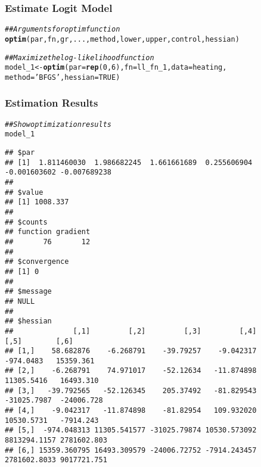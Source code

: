 \documentclass{beamer}\usepackage[]{graphicx}\usepackage[]{color}
\makeatletter
\newcommand{\hlnum}[1]{\textcolor[rgb]{0.686,0.059,0.569}{#1}}%
\newcommand{\hlstr}[1]{\textcolor[rgb]{0.192,0.494,0.8}{#1}}%
\newcommand{\hlcom}[1]{\textcolor[rgb]{0.678,0.584,0.686}{\textit{#1}}}%
\newcommand{\hlstd}[1]{\textcolor[rgb]{0.345,0.345,0.345}{#1}}%
\newcommand{\hlkwb}[1]{\textcolor[rgb]{0.69,0.353,0.396}{#1}}%
\newcommand{\hlkwc}[1]{\textcolor[rgb]{0.333,0.667,0.333}{#1}}%
\newcommand{\hlkwd}[1]{\textcolor[rgb]{0.737,0.353,0.396}{\textbf{#1}}}%
\newenvironment{kframe}{%
 \def\at@end@of@kframe{}%
 \ifinner\ifhmode%
  \def\at@end@of@kframe{\end{minipage}}%
  \begin{minipage}{\columnwidth}%
 \fi\fi%
 \def\FrameCommand##1{\hskip\@totalleftmargin \hskip-\fboxsep
 \colorbox{shadecolor}{##1}\hskip-\fboxsep
     \hskip-\linewidth \hskip-\@totalleftmargin \hskip\columnwidth}%
 \MakeFramed {\advance\hsize-\width
   \@totalleftmargin\z@ \linewidth\hsize
   \@setminipage}}%
 {\par\unskip\endMakeFramed%
 \at@end@of@kframe}
\newenvironment{knitrout}{}{} %
\makeatother
\begin{document}
\begin{frame}[fragile]\frametitle{Estimate Logit Model}
\begin{knitrout}\footnotesize
{}\color{fgcolor}\begin{kframe}
\begin{alltt}
\hlcom{## Arguments for optim function}
\hlkwd{optim}\hlstd{(par, fn, gr, ..., method, lower, upper, control, hessian)}
\end{alltt}
\end{kframe}
\end{knitrout}
    \vspace{2ex}
\begin{knitrout}\footnotesize
{}\color{fgcolor}\begin{kframe}
\begin{alltt}
\hlcom{## Maximize the log-likelihood function}
\hlstd{model_1} \hlkwb{<-} \hlkwd{optim}\hlstd{(}\hlkwc{par} \hlstd{=} \hlkwd{rep}\hlstd{(}\hlnum{0}\hlstd{,} \hlnum{6}\hlstd{),} \hlkwc{fn} \hlstd{= ll_fn_1,} \hlkwc{data} \hlstd{= heating,}
                 \hlkwc{method} \hlstd{=} \hlstr{'BFGS'}\hlstd{,} \hlkwc{hessian} \hlstd{=} \hlnum{TRUE}\hlstd{)}
\end{alltt}
\end{kframe}
\end{knitrout}
\end{frame}

\begin{frame}[fragile]\frametitle{Estimation Results}
    \vspace{1ex}
    
\begin{knitrout}\tiny
{}\color{fgcolor}\begin{kframe}
\begin{alltt}
\hlcom{## Show optimization results}
\hlstd{model_1}
\end{alltt}
\begin{verbatim}
## $par
## [1]  1.811460030  1.986682245  1.661661689  0.255606904 -0.001603602 -0.007689238
## 
## $value
## [1] 1008.337
## 
## $counts
## function gradient 
##       76       12 
## 
## $convergence
## [1] 0
## 
## $message
## NULL
## 
## $hessian
##              [,1]         [,2]         [,3]         [,4]         [,5]        [,6]
## [1,]    58.682876    -6.268791    -39.79257    -9.042317    -974.0483   15359.361
## [2,]    -6.268791    74.971017    -52.12634   -11.874898   11305.5416   16493.310
## [3,]   -39.792565   -52.126345    205.37492   -81.829543  -31025.7987  -24006.728
## [4,]    -9.042317   -11.874898    -81.82954   109.932020   10530.5731   -7914.243
## [5,]  -974.048313 11305.541577 -31025.79874 10530.573092 8813294.1157 2781602.803
## [6,] 15359.360795 16493.309579 -24006.72752 -7914.243457 2781602.8033 9017721.751
\end{verbatim}
\end{kframe}
\end{knitrout}
\end{frame}
\end{document}
